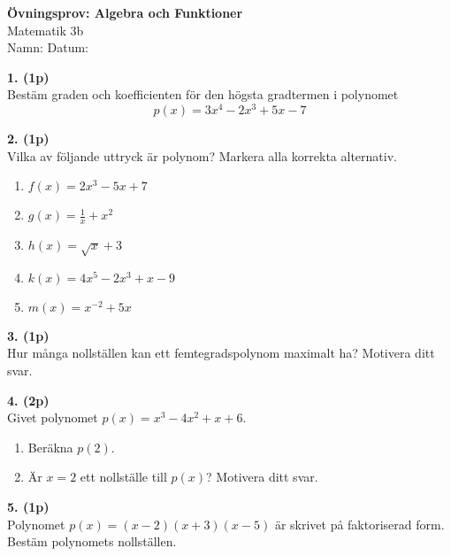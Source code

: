 \documentclass[12pt]{article}
\begin{document}
\begin{center}
\Large\textbf{Övningsprov: Algebra och Funktioner} \\
\large Matematik 3b \\[0.5cm]
\normalsize
Namn: \underline{\hspace{6cm}} \quad Datum: \underline{\hspace{3cm}}
\end{center}

\vspace{0.5cm}


\noindent
\textbf{1. (1p)} \\
Bestäm graden och koefficienten för den högsta gradtermen i polynomet
\[
p(x) = 3x^4 - 2x^3 + 5x - 7
\]

\vspace{0.5cm}

\noindent
\textbf{2. (1p)} \\
Vilka av följande uttryck är polynom? Markera alla korrekta alternativ.
\begin{enumerate}[label=$\square$ \alph*)]
    \item $f(x) = 2x^3 - 5x + 7$
    \item $g(x) = \frac{1}{x} + x^2$
    \item $h(x) = \sqrt{x} + 3$
    \item $k(x) = 4x^5 - 2x^3 + x - 9$
    \item $m(x) = x^{-2} + 5x$
\end{enumerate}

\vspace{0.5cm}

\noindent
\textbf{3. (1p)} \\
Hur många nollställen kan ett femtegradspolynom maximalt ha? Motivera ditt svar.

\vspace{0.5cm}

\noindent
\textbf{4. (2p)} \\
Givet polynomet $p(x) = x^3 - 4x^2 + x + 6$.
\begin{enumerate}[label=\alph*)]
    \item Beräkna $p(2)$.
    \item Är $x = 2$ ett nollställe till $p(x)$? Motivera ditt svar.
\end{enumerate}

\vspace{0.5cm}

\noindent
\textbf{5. (1p)} \\
Polynomet $p(x) = (x - 2)(x + 3)(x - 5)$ är skrivet på faktoriserad form. Bestäm polynomets nollställen.
\end{document}
